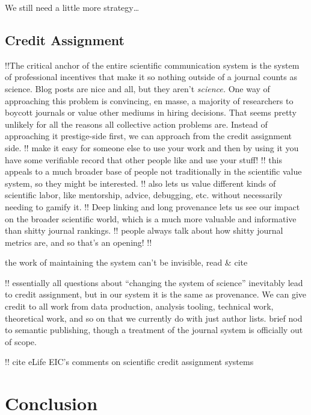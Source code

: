 \documentclass[10pt]{tufte-book}
\begin{document}
We still need a little more strategy\ldots{}






\subsection{Credit Assignment}



 !!The critical anchor of the entire scientific
communication system is the system of professional incentives that make
it so nothing outside of a journal counts as science. Blog posts are
nice and all, but they aren't \emph{science.} One way of approaching
this problem is convincing, en masse, a majority of researchers to
boycott journals or value other mediums in hiring decisions. That seems
pretty unlikely for all the reasons all collective action problems are.
Instead of approaching it prestige-side first, we can approach from the
credit assignment side. !! make it easy for someone else to use your
work and then by using it you have some verifiable record that other
people like and use your stuff! !! this appeals to a much broader base
of people not traditionally in the scientific value system, so they
might be interested. !! also lets us value different kinds of scientific
labor, like mentorship, advice, debugging, etc. without necessarily
needing to gamify it. !! Deep linking and long provenance lets us see
our impact on the broader scientific world, which is a much more
valuable and informative than shitty journal rankings. !! people always
talk about how shitty journal metrics are, and so that's an opening! !!

the work of maintaining the system can't be invisible, read \& cite \citep{classeDistributedInfrastructureSupport2017, bowkerInformationInfrastructureStudies2010} 

!! essentially all questions about ``changing the system of science''
inevitably lead to credit assignment, but in our system it is the same
as provenance. We can give credit to all work from data production,
analysis tooling, technical work, theoretical work, and so on that we
currently do with just author lists. brief nod to semantic publishing,
though a treatment of the journal system is officially out of scope.

!! cite eLife EIC's comments on scientific credit assignment systems






\section{Conclusion}
\end{document}
